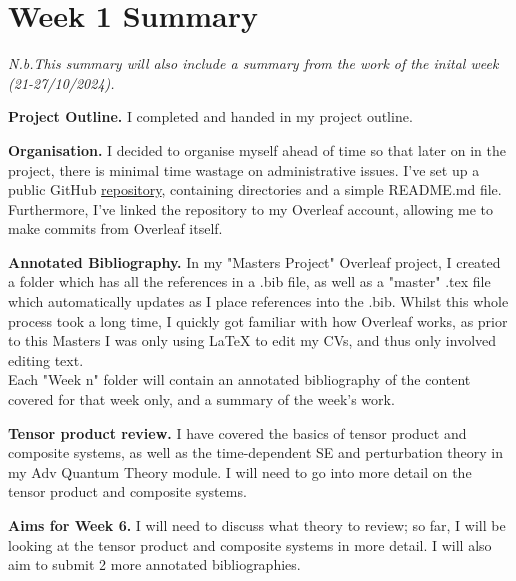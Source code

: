 \documentclass{article}
\begin{document}
\section*{Week 1 Summary}
\small{\textit{N.b.This summary will also include a summary from the work of the inital week (21-27/10/2024). }}

\vspace{0.5cm}

\textbf{Project Outline.} I completed and handed in my project outline.

\vspace{0.5cm}

\textbf{Organisation.} I decided to organise myself ahead of time so that later on in the project, there is minimal time wastage on administrative issues. I've set up a public GitHub \href{https://github.com/rowan-adeya/masters-project.git}{repository}, containing directories and a simple README.md file. Furthermore, I've linked the repository to my Overleaf account, allowing me to make commits from Overleaf itself.

\vspace{0.5cm}

\textbf{Annotated Bibliography.} In my "Masters Project" Overleaf project, I created a folder which has all the references in a .bib file, as well as a "master" 
.tex file which automatically updates as I place references into the .bib. Whilst this whole process took a long time, I quickly got familiar with how Overleaf works, as prior to this Masters I was only using LaTeX to edit my CVs, and thus only involved editing text. \\ Each "Week n" folder will contain an annotated bibliography of the content covered for that week only, and a summary of the week's work.

\vspace{0.5cm}

\textbf{Tensor product review.} I have covered the basics of tensor product and composite systems, as well as the time-dependent SE and perturbation theory in my Adv Quantum Theory module. I will need to go into more detail on the tensor product and composite systems. 
\vspace{0.5cm}

\textbf{Aims for Week 6.} I will need to discuss what theory to review; so far, I will be looking at the tensor product and composite systems in more detail. I will also aim to submit 2 more annotated bibliographies. 
\end{document}
